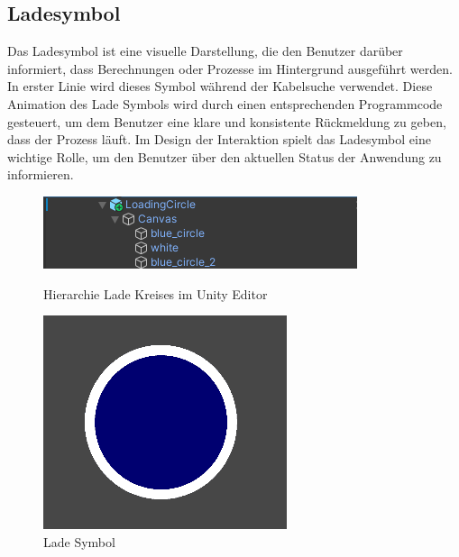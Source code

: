 \subsection{Ladesymbol}\label{sec:ladeSymbol}
Das Ladesymbol ist eine visuelle Darstellung, die den Benutzer darüber informiert, dass Berechnungen oder Prozesse im Hintergrund ausgeführt werden. In erster Linie wird dieses Symbol während der Kabelsuche verwendet. Diese Animation des Lade Symbols wird durch einen entsprechenden Programmcode gesteuert, um dem Benutzer eine klare und konsistente Rückmeldung zu geben, dass der Prozess läuft. Im Design der Interaktion spielt das Ladesymbol eine wichtige Rolle, um den Benutzer über den aktuellen Status der Anwendung zu informieren.
\begin{figure}[H]
    \centering
    \begin{minipage}[b]{0.65\textwidth}
        \centering
        \includegraphics[width=\textwidth]{images/LadeKreisHierachy.png}
        \caption{Hierarchie Lade Kreises im Unity Editor}
    \end{minipage}
    \hfill
    \begin{minipage}[b]{0.3\textwidth}
        \centering
        \includegraphics[width=\textwidth]{images/LadeKreisBsp.png}
        \caption{Lade Symbol}
        \label{fig:Loading}
    \end{minipage}
\end{figure}
